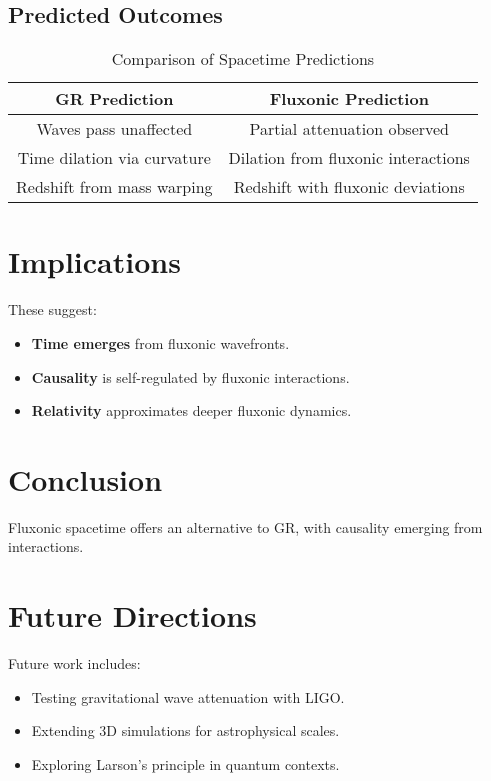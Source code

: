 \documentclass{article}
\begin{document}
\subsection{Predicted Outcomes}
\begin{table}[h]
    \centering
    \begin{tabular}{|c|c|}
        \hline
        \textbf{GR Prediction} & \textbf{Fluxonic Prediction} \\
        \hline
        Waves pass unaffected & Partial attenuation observed \\
        Time dilation via curvature & Dilation from fluxonic interactions \\
        Redshift from mass warping & Redshift with fluxonic deviations \\
        \hline
    \end{tabular}
    \caption{Comparison of Spacetime Predictions}
    \label{tab:predictions}
\end{table}

\section{Implications}
These suggest:
\begin{itemize}
    \item \textbf{Time emerges} from fluxonic wavefronts.
    \item \textbf{Causality} is self-regulated by fluxonic interactions.
    \item \textbf{Relativity} approximates deeper fluxonic dynamics.
\end{itemize}

\section{Conclusion}
Fluxonic spacetime offers an alternative to GR, with causality emerging from interactions.

\section{Future Directions}
Future work includes:
\begin{itemize}
    \item Testing gravitational wave attenuation with LIGO.
    \item Extending 3D simulations for astrophysical scales.
    \item Exploring Larson’s principle in quantum contexts.
\end{itemize}
\end{document}
